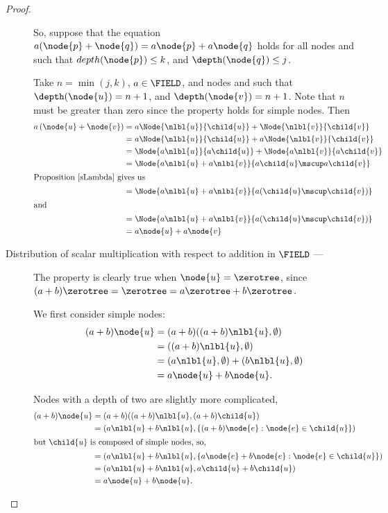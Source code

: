 \begin{proposition}
\begin{proof}
\begin{description}
      So, suppose that the equation $a ( \node{p} + \node{q}) =
      a \node{p} + a \node{q}$ holds for all nodes  and
       such that $depth(\node{p}) \leq k$, and
      $\depth(\node{q}) \leq j$.

      Take $n = \min(j, k)$, $a\in\FIELD$, and nodes  and  such that
      $\depth(\node{u}) = n+1$, and $\depth(\node{v}) = n+1$.
      Note that $n$ must be greater than zero since the property holds for simple
      nodes.  Then
      \begin{align*}
        a \left(\node{u} + \node{v}\right) &= a \Node{\nlbl{u}}{\child{u}} + \Node{\nlbl{v}}{\child{v}}\\
        &= a\Node{\nlbl{u}}{\child{u}} + a\Node{\nlbl{v}}{\child{v}}\\        
        &= \Node{a \nlbl{u}}{a \child{u}} + \Node{a \nlbl{v}}{a \child{v}}\\
        &= \Node{a \nlbl{u} + a \nlbl{v}}{a \child{u} \mscup a \child{v}}\\
        \intertext{Proposition \ref{sLambda} gives us}
        &= \Node{a \nlbl{u} + a \nlbl{v}}{a(\child{u} \mscup \child{v})}\\
        \intertext{and }
        &= \Node{a \nlbl{u} + a \nlbl{v}}{a (\child{u} \mscup \child{v})}\\
        &= a\node{u} + a\node{v}
      \end{align*}

    \item[Distribution of scalar multiplication with respect to addition in $\FIELD$  --- ]

      The property is clearly true when $\node{u} = \zerotree$,
      since $(a+b)\zerotree = \zerotree = a\zerotree+b\zerotree$.

      We first consider simple nodes:
      \begin{align*}
        (a + b)\node{u} &= (a + b) ((a + b)\nlbl{u}, \emptyset) \\
        &= ((a + b)\nlbl{u}, \emptyset) \\
        &= (a\nlbl{u}, \emptyset) + (b\nlbl{u}, \emptyset) \\
        &= a \node{u} + b \node{u}.
      \end{align*}

      Nodes with a depth of two are slightly more complicated, 
      \begin{align*}
        (a + b)\node{u} &= (a + b) ((a + b)\nlbl{u}, (a + b)\child{u}) \\
        &= (a\nlbl{u} + b\nlbl{u}, \{(a + b)\node{e}:\node{e}\in\child{u}\}) \\
        \intertext{but $\child{u}$ is composed of simple nodes, so,}
        &= (a\nlbl{u} + b\nlbl{u}, \{a \node{e} + b \node{e}:\node{e}\in\child{u}\}) \\
        &= (a\nlbl{u} + b\nlbl{u}, a\child{u} + b\child{u}) \\
        &= a \node{u} + b\node{u}.
      \end{align*}


\end{description}
\end{proof}
\end{proposition}
